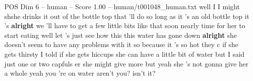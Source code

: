 \begin{textsample}{POS Dim 6 – human – Score 1.00 – human/t001048\_human.txt}  \label{ex:f6_pos_016}
well I I might shshe drinks it out of the bottle top that 'll do so long as it 's an old bottle top it 's \textbf{alright} we 'll have to get a few little bits like that soon nearly time for her to start eating well let 's just see how this this water has gone down \textbf{alright} she doesn't seem to have any problems with it so because it 's so hot they c if she gets thirsty I told if she gets hiccups she can have a little bit of water but I said just one or two capfuls er she might give more but yeah she 's not gonna give her a whole yeah you 're on water aren't you? isn't it?

\end{textsample}
